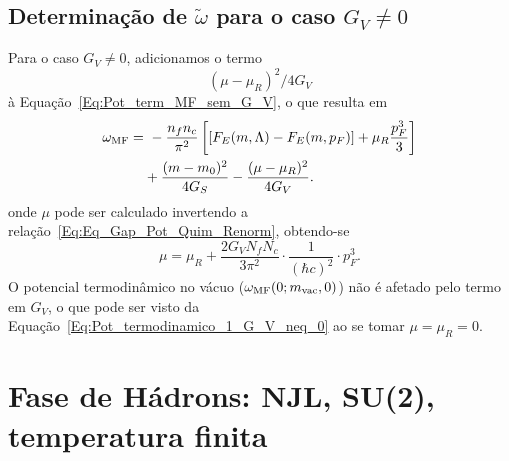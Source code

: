 \subsection{Determinação de $\tilde\omega$ para o caso $G_V \neq 0$}

Para o caso $G_V \neq 0$, adicionamos o termo 
\begin{equation}
	(\mu-\mu_R)^2 / 4G_V
\end{equation}
%
à Equação~\eqref{Eq:Pot_term_MF_sem_G_V}, o que resulta em 
\begin{equation}\label{Eq:Pot_termodinamico_1_G_V_neq_0}
\begin{split}
\omega_{\rm{MF}} =&~ - \frac{n_f n_c}{\pi^2} \left[[F_E(m,\Lambda) - F_E(m, p_F)] + \mu_R \frac{p_F^3}{3} \right] \\
&+ \frac{(m-m_0)^2}{4G_S} - \frac{(\mu - \mu_R)^2}{4G_V}.
\end{split}
\end{equation}
%
onde $\mu$ pode ser calculado invertendo a relação~\eqref{Eq:Eq_Gap_Pot_Quim_Renorm}, obtendo-se
\begin{equation}
	\mu = \mu_R + \frac{2G_V N_fN_c}{3\pi^2} \cdot \frac{1}{(\hbar c)^2} \cdot p_F^3.
\end{equation}
%
O potencial termodinâmico no vácuo ($\omega_{\rm{MF}}(0; m_{\rm{vac}}, 0)$) não é afetado pelo termo em $G_V$, o que pode ser visto da Equação~\eqref{Eq:Pot_termodinamico_1_G_V_neq_0} ao se tomar $\mu = \mu_R = 0$.

\section{Fase de Hádrons: NJL, SU(2), temperatura finita}

